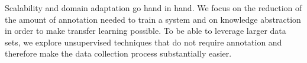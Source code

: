 Scalability and domain adaptation go hand in hand.
We focus on the reduction of the amount of annotation needed to train a system and on knowledge abstraction in order to make transfer learning possible.
To be able to leverage larger data sets, we explore unsupervised techniques that do not require annotation and therefore make the data collection process substantially easier.



